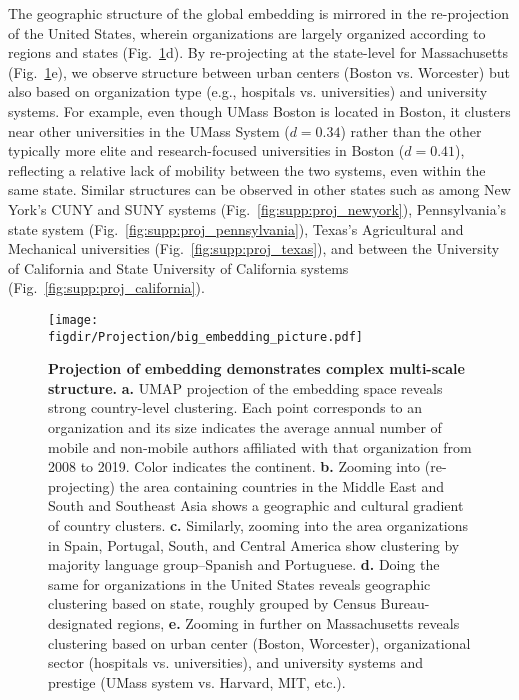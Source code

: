 \documentclass[12pt]{article} %
\def\figdir{../Figs}
\begin{document}
The geographic structure of the global embedding is mirrored in the re-projection of the United States, wherein organizations are largely organized according to regions and states (Fig.~\ref{fig:projection}d).
By re-projecting at the state-level for Massachusetts (Fig.~\ref{fig:projection}e), we observe structure between urban centers (Boston vs. Worcester) but also based on organization type (e.g., hospitals vs. universities) and university systems.
For example, even though UMass Boston is located in Boston, it clusters near other universities in the UMass System ($d = 0.34$) rather than the other typically more elite and research-focused universities in Boston ($d = 0.41$), reflecting a relative lack of mobility between the two systems, even within the same state.
Similar structures can be observed in other states such as among New York's CUNY and SUNY systems (Fig.~\ref{fig:supp:proj_newyork}), Pennsylvania's state system (Fig.~\ref{fig:supp:proj_pennsylvania}), Texas's Agricultural and Mechanical universities (Fig.~\ref{fig:supp:proj_texas}), and between the University of California and State University of California systems (Fig.~\ref{fig:supp:proj_california}). 


\begin{figure}[hp!]
	\centering
	\texttt{[image: \\figdir/Projection/big\_embedding\_picture.pdf]}
	\caption{
		\textbf{Projection of embedding demonstrates complex multi-scale structure.}
		\textbf{a.}
		UMAP projection \autocite{mcinnes2018umap} of the embedding space reveals strong country-level clustering.
		Each point corresponds to an organization and its size indicates the average annual number of mobile and non-mobile authors affiliated with that organization from 2008 to 2019. 
		Color indicates the continent.
		\textbf{b.} Zooming into (re-projecting) the area containing countries in the Middle East and South and Southeast Asia shows a geographic and cultural gradient of country clusters. 
		\textbf{c.} Similarly, zooming into the area organizations in Spain, Portugal, South, and Central America show clustering by majority language group--Spanish and Portuguese.
		\textbf{d.} Doing the same for organizations in the United States reveals geographic clustering based on state, roughly grouped by Census Bureau-designated regions,
		\textbf{e.} Zooming in further on Massachusetts reveals clustering based on urban center (Boston, Worcester), organizational sector (hospitals vs. universities), and university systems and prestige (UMass system vs. Harvard, MIT, etc.).
	}
	\label{fig:projection}
\end{figure}
\end{document}
